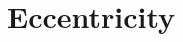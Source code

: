 \hypertarget{group___e_g_x_phys-_eccentricity}{}\section{Eccentricity}
\label{group___e_g_x_phys-_eccentricity}
